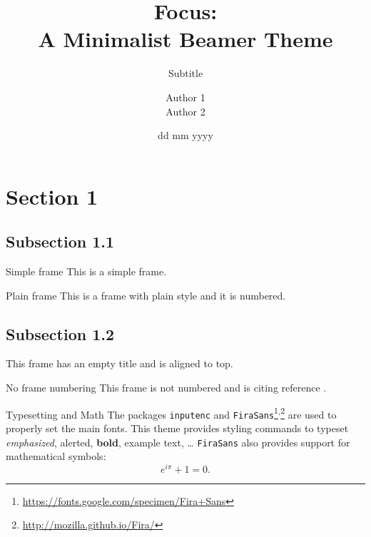 \documentclass{beamer}
\title{Focus: \\ A Minimalist Beamer Theme}
\subtitle{Subtitle}
\author{Author 1\texorpdfstring{\\}{,} Author 2}
\institute{Institute Name \\ Institute Address}
\date{dd mm yyyy}
\begin{document}
    \begin{frame}
        \maketitle
    \end{frame}
    
    \section{Section 1}
    \subsection{Subsection 1.1}
    \begin{frame}{Simple frame}
        This is a simple frame.
    \end{frame}

    \begin{frame}[plain]{Plain frame}
        This is a frame with plain style and it is numbered.
    \end{frame}
    
    \subsection{Subsection 1.2}
    \begin{frame}[t]
        This frame has an empty title and is aligned to top.
    \end{frame}
    
    \begin{frame}[noframenumbering]{No frame numbering}
        This frame is not numbered and is citing reference \cite{knuth74}.
    \end{frame}
    
    \begin{frame}{Typesetting and Math}
        The packages \texttt{inputenc} and \texttt{FiraSans}\footnote{\url{https://fonts.google.com/specimen/Fira+Sans}}\textsuperscript{,}\footnote{\url{http://mozilla.github.io/Fira/}} are used to properly set the main fonts.
        \vfill
        This theme provides styling commands to typeset \emph{emphasized}, \alert{alerted}, \textbf{bold}, \textcolor{example}{example text}, \dots
        \vfill
        \texttt{FiraSans} also provides support for mathematical symbols:
        \begin{equation*}
            e^{i\pi} + 1 = 0.
        \end{equation*}
    \end{frame}
\end{document}
